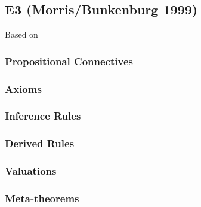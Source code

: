 \subsection{\textbf{E3} (Morris/Bunkenburg 1999)}
Based on \cite{MB99}


\subsubsection{Propositional Connectives}


\subsubsection{Axioms}


\subsubsection{Inference Rules}


\subsubsection{Derived Rules}


\subsubsection{Valuations}


\subsubsection{Meta-theorems}

